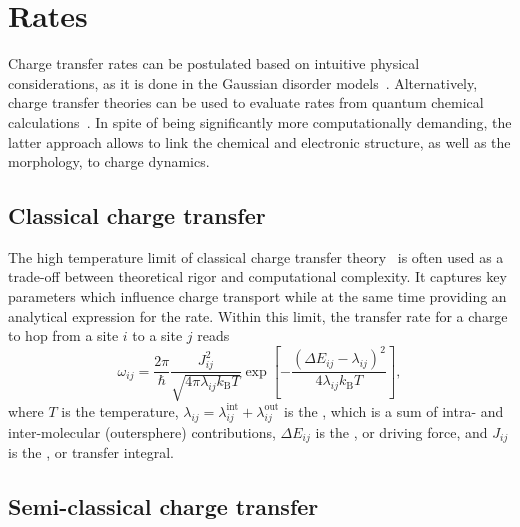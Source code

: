 \chapter{Rates}
\label{sec:rates}

Charge transfer rates can be postulated based on intuitive physical considerations, as it is done in the Gaussian disorder models~\cite{walker_electrical_2002,baessler_charge_1993,borsenberger_charge_1991,pasveer_unified_2005}. Alternatively, charge transfer theories can be used to evaluate rates from quantum chemical calculations~\cite{bredas_molecular_2009,coropceanu_charge_2007,bredas_charge-transfer_2004,nelson_modeling_2009,baumeier_density-functional_2010,ruhle_microscopic_2011}. In spite of being significantly more computationally demanding, the latter approach allows to link the chemical and electronic structure, as well as the morphology, to charge dynamics.

\section{Classical charge transfer}
\label{sec:rate_classical}

The high temperature limit of classical charge transfer  theory~\cite{marcus_electron_1993,hutchison_hopping_2005} is often used as a trade-off between theoretical rigor and computational complexity. It captures key parameters which influence charge transport while at the same time providing an analytical expression for the rate. Within this limit, the transfer rate for a charge to hop from a site $i$ to a site $j$ reads
%
\begin{equation}
\omega_{ij}  = \frac{2 \pi}{\hbar}  \frac{ J_{ij}^2 }{\sqrt{ 4 \pi \lambda_{ij} k_\text{B}T}} \exp \left[
-\frac{\left(\Delta E_{ij}-\lambda_{ij}\right)^2}{4 \lambda_{ij}
k_\text{B} T} \right],
\label{equ:marcus}
\end{equation}
%
where $T$ is the temperature, $\lambda_{ij} = \lambda_{ij}^\text{int} + \lambda_{ij}^\text{out}$ is the , which is a sum of intra- and inter-molecular (outersphere) contributions, $\Delta E_{ij}$ is the , or driving force, and $J_{ij}$ is the , or transfer integral. 


\section{Semi-classical charge transfer}
\label{sec:rate_bimolecular}

